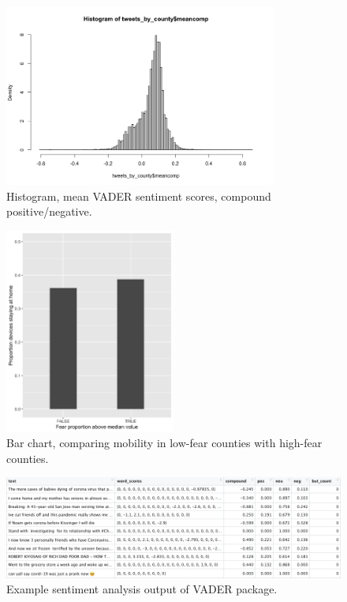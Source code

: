 \documentclass[12pt,a4]{article}
\begin{document}
\begin{figure}[h!]
  \includegraphics[width=0.8\textwidth]{figs/meancomp_hist.png}    
  \centering
  \caption{Histogram, mean VADER sentiment scores, compound positive/negative.}
  \label{meancomp_hist}
\end{figure}


\begin{figure}[!htb]
  \includegraphics[width=0.5\textwidth]{figs/setsplit.png}    
  \centering
  \caption{Bar chart, comparing mobility in low-fear counties with high-fear counties.}
  \label{setsplit}
\end{figure}


\begin{landscape}
  \vspace{1.5in}
  \begin{figure}[h!]
    \includegraphics[width=\textwidth]{figs/vader-table.png}    
    \centering
    \caption{Example sentiment analysis output of VADER package.}\label{vaderfig}
  \end{figure}
  \end{landscape}
\end{document}
